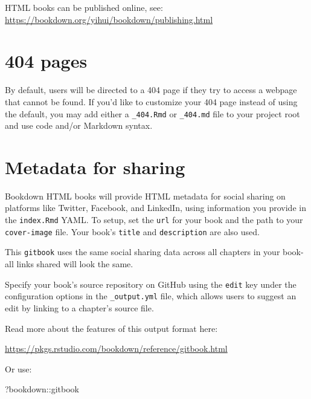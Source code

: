 \documentclass[
]{book}
\newenvironment{Shaded}{\begin{snugshade}}{\end{snugshade}}
\newcommand{\NormalTok}[1]{#1}
\newcommand{\SpecialCharTok}[1]{\textcolor[rgb]{0.00,0.00,0.00}{#1}}
\theoremstyle{definition}
\theoremstyle{definition}
\theoremstyle{definition}
\theoremstyle{definition}
\theoremstyle{remark}
\begin{document}
HTML books can be published online, see: \url{https://bookdown.org/yihui/bookdown/publishing.html}

\hypertarget{pages}{%
\section{404 pages}\label{pages}}

By default, users will be directed to a 404 page if they try to access a webpage that cannot be found. If you'd like to customize your 404 page instead of using the default, you may add either a \texttt{\_404.Rmd} or \texttt{\_404.md} file to your project root and use code and/or Markdown syntax.

\hypertarget{metadata-for-sharing}{%
\section{Metadata for sharing}\label{metadata-for-sharing}}

Bookdown HTML books will provide HTML metadata for social sharing on platforms like Twitter, Facebook, and LinkedIn, using information you provide in the \texttt{index.Rmd} YAML. To setup, set the \texttt{url} for your book and the path to your \texttt{cover-image} file. Your book's \texttt{title} and \texttt{description} are also used.

This \texttt{gitbook} uses the same social sharing data across all chapters in your book- all links shared will look the same.

Specify your book's source repository on GitHub using the \texttt{edit} key under the configuration options in the \texttt{\_output.yml} file, which allows users to suggest an edit by linking to a chapter's source file.

Read more about the features of this output format here:

\url{https://pkgs.rstudio.com/bookdown/reference/gitbook.html}

Or use:

\begin{Shaded}
\begin{Highlighting}[]
\NormalTok{?bookdown}\SpecialCharTok{::}\NormalTok{gitbook}
\end{Highlighting}
\end{Shaded}


  
\end{document}
